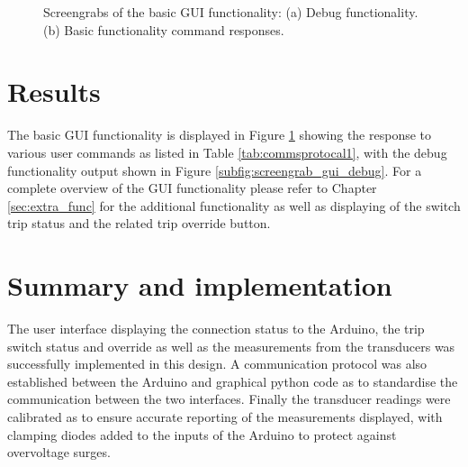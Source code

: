\begin{figure}[h]
\begin{subfigure}[]{0.49\textwidth}
		   \caption{ } \label{subfig:screengrab_gui_other}
     \end{subfigure}
   \caption[Screengrabs of the basic GUI functionality]{Screengrabs of the basic GUI functionality: (a) Debug functionality. (b)  Basic functionality command responses. }
    \label{fig:gui_results}
 \end{figure}

\section{Results} \label{sec:rep_results}
The basic GUI functionality is displayed in Figure \ref{subfig:screengrab_gui_other} showing the response to various user commands as listed in Table \ref{tab:commsprotocal1}, with the debug functionality output shown in Figure \ref{subfig:screengrab_gui_debug}. For a complete overview of the GUI functionality please refer to Chapter \ref{sec:extra_func} for the additional functionality as well as displaying of the switch trip status and the related trip override button.
 
\section{Summary and implementation}
The user interface displaying the connection status to the Arduino, the trip switch status and override as well as the measurements from the transducers was successfully implemented in this design. A communication protocol was also established between the Arduino and graphical python code as to standardise the communication between the two interfaces. Finally the transducer readings were calibrated as to ensure accurate reporting of the measurements displayed, with clamping diodes added to the inputs of the Arduino to protect against overvoltage surges.

